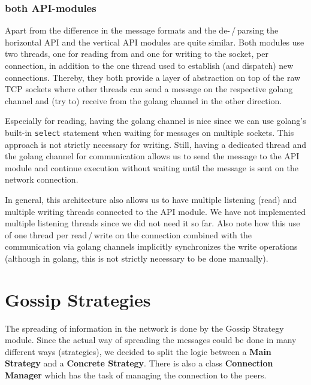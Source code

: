 \documentclass[a4paper,english,10pt,NET]{tumarticle}
\begin{document}
\subsubsection{both API-modules}
Apart from the difference in the message formats and the de-\,/\,parsing the horizontal API and the vertical API modules are quite similar.
Both modules use two threads, one for reading from and one for writing to the socket, per connection, in addition to the one thread used to establish (and dispatch) new connections.
Thereby, they both provide a layer of abstraction on top of the raw TCP sockets where other threads can send a message on the respective golang channel and (try to) receive from the golang channel in the other direction.

Especially for reading, having the golang channel is nice since we can use golang's built-in \texttt{select} statement when waiting for messages on multiple sockets.
This approach is not strictly necessary for writing.
Still, having a dedicated thread and the golang channel for communication allows us to send the message to the API module and continue execution without waiting until the message is sent on the network connection.

In general, this architecture also allows us to have multiple listening (read) and multiple writing threads connected to the API module.
We have not implemented multiple listening threads since we did not need it so far.
Also note how this use of one thread per read\,/\,write on the connection combined with the communication via golang channels implicitly synchronizes the write operations (although in golang, this is not strictly necessary to be done manually).


\section{Gossip Strategies}

The spreading of information in the network is done by the Gossip Strategy module. Since the actual way of spreading the messages could be done in many different ways (strategies), we decided to split the logic between a \textbf{Main Strategy} and a \textbf{Concrete Strategy}. There is also a class \textbf{Connection Manager} which has the task of managing the connection to the peers. 
\end{document}
